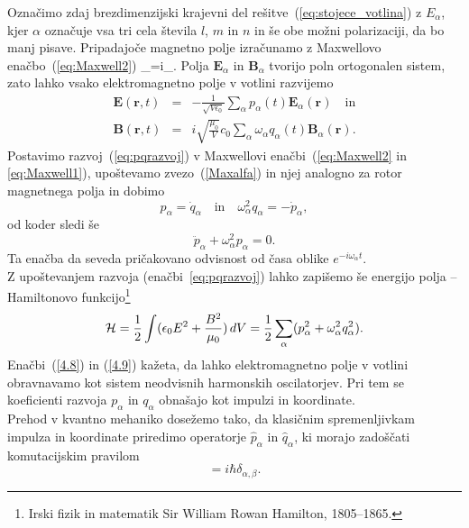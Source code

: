 \noindent
Označimo zdaj brezdimenzijski krajevni del rešitve~(\ref{eq:stojece_votlina}) z 
$E_{\alpha}$, kjer $\alpha$
označuje vsa tri cela števila $l$, $m$ in $n$ in še obe možni polarizaciji, da bo manj pisave. 
Pripadajoče magnetno polje izračunamo z Maxwellovo enačbo~(\ref{eq:Maxwell2}) 
\beq
\nabla\times{}_{\alpha}=i\omega{}_{\alpha}.
\label{Maxalfa}
\eeq
Polja $\mathbf{E}_{\alpha}$ in $\mathbf{B}_{\alpha}$ tvorijo poln ortogonalen
sistem, zato lahko vsako elektromagnetno polje v votlini razvijemo
\begin{eqnarray}
\mathbf{E}(\mathbf{r},t) & = & -\frac{1}{\sqrt{V\epsilon_{0}}}
\sum_{\alpha}p_{\alpha}(t)\mathbf{E}_{\alpha}(\mathbf{r}) \quad \mathrm{in}\nonumber \\
\mathbf{B}(\mathbf{r},t) & = & i\sqrt{\frac{\mu_{0}}{V}}c_0\sum_{\alpha}
\omega_{\alpha}q_{\alpha}(t)\mathbf{B}_{\alpha}(\mathbf{r}).
\label{eq:pqrazvoj}
\end{eqnarray}
Postavimo razvoj~(\ref{eq:pqrazvoj}) v Maxwellovi enačbi~(\ref{eq:Maxwell2}
in \ref{eq:Maxwell1}), upoštevamo zvezo~(\ref{Maxalfa}) in njej analogno za rotor magnetnega polja
in dobimo 
\begin{equation}
p_{\alpha}=\dot{q}_{\alpha} \quad \mathrm{in} \quad 
\omega_{\alpha}^{2}q_{\alpha}=-\dot{p}_{\alpha},
\label{4.7}
\end{equation}
od koder sledi še 
\begin{equation}
\ddot{p}_{\alpha}+\omega_{\alpha}^{2}p_{\alpha}=0.
\label{4.8}
\end{equation}
Ta enačba da seveda pričakovano odvisnost od časa oblike $e^{-i \omega_\alpha t}$.\\

\noindent
Z upoštevanjem razvoja (enačbi~\ref{eq:pqrazvoj}) lahko zapišemo še energijo 
polja -- Hamiltonovo 
funkcijo\footnote{Irski fizik in matematik Sir William Rowan Hamilton, 1805--1865.}
\begin{equation}
{\cal H}=\frac{1}{2}\int(\epsilon_{0}E^{2}+\frac{B^{2}}{\mu_0})\, 
dV=\frac{1}{2}\sum_{\alpha}(p_{\alpha}^{2}+\omega_{\alpha}^{2}q_{\alpha}^{2}).
\label{4.9}
\end{equation}
Enačbi~(\ref{4.8}) in (\ref{4.9}) kažeta, da lahko elektromagnetno polje v votlini
obravnavamo kot sistem neodvisnih harmonskih oscilatorjev. 
Pri tem se koeficienti razvoja $p_{\alpha}$ in $q_{\alpha}$ obnašajo kot
impulzi in koordinate. \\

\noindent
Prehod v kvantno mehaniko dosežemo tako, da klasičnim spremenljivkam impulza in koordinate
priredimo operatorje $\hat{p}_{\alpha}$ in $\hat{q}_{\alpha}$,
ki morajo zadoščati komutacijskim pravilom 
\begin{equation}
[\hat{q}_{\alpha},\hat{p}_{\beta}]=i\hbar \delta_{\alpha, \beta}.
\label{4.10}
\end{equation}

